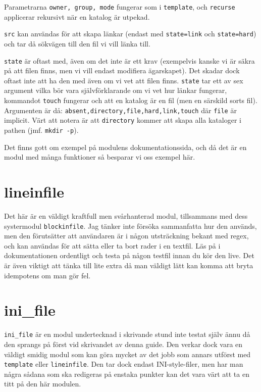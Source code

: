 Parametrarna \verb?owner, group, mode? fungerar som i \texttt{template}, och \texttt{recurse} applicerar rekursivt när en katalog är utpekad.

\texttt{src} kan användas för att skapa länkar (endast med \texttt{state=link} och \texttt{state=hard}) och tar då sökvägen till den fil vi vill länka till.

\texttt{state} är oftast med, även om det inte är ett krav (exempelvis kanske vi är säkra på att filen finns, men vi
vill endast modifiera ägarskapet). Det skadar dock oftast inte att ha den med även om vi vet att filen finns.
\texttt{state} tar ett av sex argument vilka bör vara självförklarande om vi vet hur länkar fungerar, kommandot 
\texttt{touch} fungerar och att en katalog är en fil (men en särskild sorts fil). Argumenten är då:
\verb=absent,directory,file,hard,link,touch= där \texttt{file} är implicit. Värt att notera är att \texttt{directory} kommer att skapa alla kataloger i pathen (jmf. \texttt{mkdir -p}).

Det finns gott om exempel på modulens dokumentationssida, och då det är en modul med många funktioner så besparar vi
oss exempel här.

\section{lineinfile}
Det här är en väldigt kraftfull men svårhanterad modul, tillsammans med dess systermodul \texttt{blockinfile}. Jag tänker inte försöka sammanfatta hur den används, men den förutsätter att användaren är i någon utsträckning bekant
med regex, och kan användas för att sätta eller ta bort rader i en textfil. Läs på i dokumentationen ordentligt och testa på någon testfil innan du kör den live.
Det är även viktigt att tänka till lite extra då man väldigt lätt kan komma att bryta idempotens om man gör fel.

\section{ini\_file}
\texttt{ini\_file} är en modul undertecknad i skrivande stund inte testat själv ännu då den sprangs på först vid
skrivandet av denna guide. Den verkar dock vara en väldigt smidig modul som kan göra mycket av det jobb som annars
utförst med \texttt{template} eller \texttt{lineinfile}. Den tar dock endast INI-style-filer, men har man några 
sådana som ska redigeras på enstaka punkter kan det vara värt att ta en titt på den här modulen.

